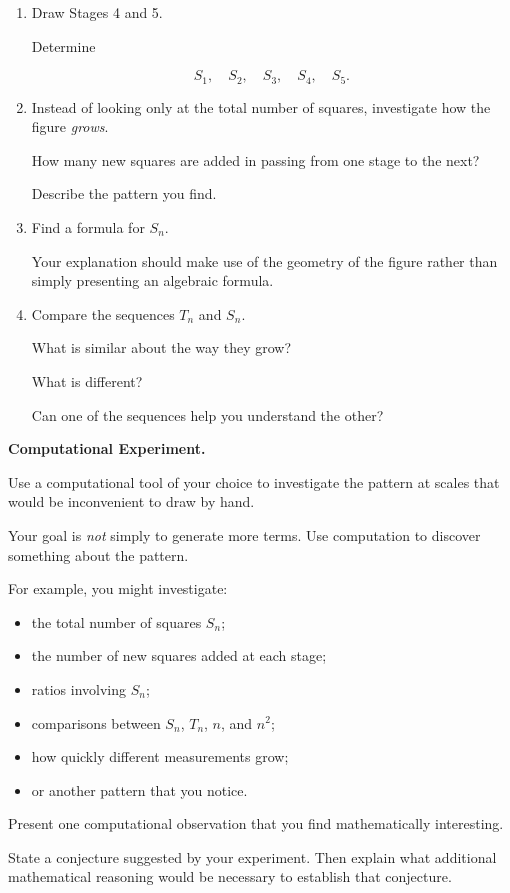 \documentclass[11pt]{article}
\begin{document}
\begin{enumerate}[label=\textbf{\alph*.}, leftmargin=2em]

\item
Draw Stages 4 and 5.

Determine

\[
S_1,\quad S_2,\quad S_3,\quad S_4,\quad S_5.
\]

\item
Instead of looking only at the total number of squares, investigate
how the figure \emph{grows}.

How many new squares are added in passing from one stage to the next?

Describe the pattern you find.

\item
Find a formula for \(S_n\).

Your explanation should make use of the geometry of the figure rather
than simply presenting an algebraic formula.

\item
Compare the sequences \(T_n\) and \(S_n\).

What is similar about the way they grow?

What is different?

Can one of the sequences help you understand the other?

\end{enumerate}

\begin{reflection}
\textbf{Computational Experiment.}

Use a computational tool of your choice to investigate the pattern at
scales that would be inconvenient to draw by hand.

Your goal is \emph{not} simply to generate more terms. Use computation
to discover something about the pattern.

For example, you might investigate:

\begin{itemize}[leftmargin=2em]
    \item the total number of squares \(S_n\);
    \item the number of new squares added at each stage;
    \item ratios involving \(S_n\);
    \item comparisons between \(S_n\), \(T_n\), \(n\), and \(n^2\);
    \item how quickly different measurements grow;
    \item or another pattern that you notice.
\end{itemize}

Present one computational observation that you find mathematically
interesting.

State a conjecture suggested by your experiment. Then explain what
additional mathematical reasoning would be necessary to establish
that conjecture.
\end{reflection}
\end{document}
